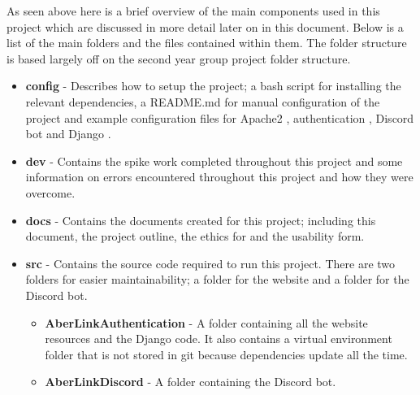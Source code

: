 As seen above here is a brief overview of the main components used in this project which are discussed in more detail later on in this document. Below is a list of the main folders and the files contained within them. The folder structure is based largely off on the second year group project folder structure.

\begin{itemize}
	\item \textbf{config} - Describes how to setup the project; a bash script for installing the relevant dependencies, a README.md for manual configuration of the project and example configuration files for Apache2 \cite{apache2}, authentication \cite{libapache2-mod-auth-openidc}, Discord bot and Django \cite{Django}.
	\item \textbf{dev} - Contains the spike work completed throughout this project and some information on errors encountered throughout this project and how they were overcome.
	\item \textbf{docs} - Contains the documents created for this project; including this document, the project outline, the ethics for and the usability form.
	\item \textbf{src} - Contains the source code required to run this project. There are two folders for easier maintainability; a folder for the website and a folder for the Discord bot.
	\begin{itemize}
		\item \textbf{AberLinkAuthentication} - A folder containing all the website resources and the Django \cite{Django} code. It also contains a virtual environment \cite{pipenv} folder that is not stored in git because dependencies update all the time.
		\item \textbf{AberLinkDiscord} - A folder containing the Discord bot. 
	\end{itemize}
\end{itemize}



